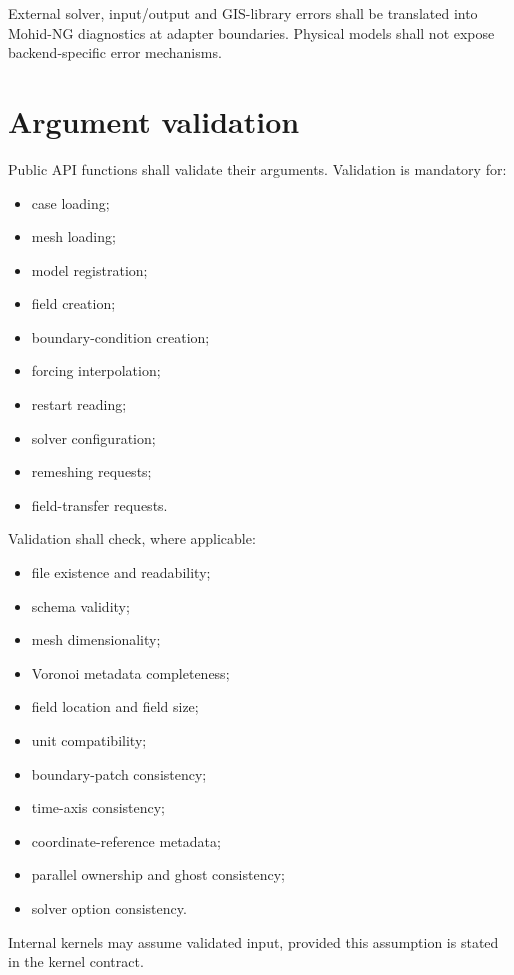\documentclass[11pt,a4paper]{article}
\begin{document}
External solver, input/output and GIS-library errors shall be translated into Mohid-NG diagnostics at adapter boundaries. Physical models shall not expose backend-specific error mechanisms.

\section{Argument validation}

Public API functions shall validate their arguments. Validation is mandatory for:

\begin{itemize}
  \item case loading;
  \item mesh loading;
  \item model registration;
  \item field creation;
  \item boundary-condition creation;
  \item forcing interpolation;
  \item restart reading;
  \item solver configuration;
  \item remeshing requests;
  \item field-transfer requests.
\end{itemize}

Validation shall check, where applicable:

\begin{itemize}
  \item file existence and readability;
  \item schema validity;
  \item mesh dimensionality;
  \item Voronoi metadata completeness;
  \item field location and field size;
  \item unit compatibility;
  \item boundary-patch consistency;
  \item time-axis consistency;
  \item coordinate-reference metadata;
  \item parallel ownership and ghost consistency;
  \item solver option consistency.
\end{itemize}

Internal kernels may assume validated input, provided this assumption is stated in the kernel contract.
\end{document}
